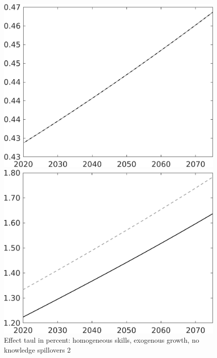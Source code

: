 \documentclass[12pt]{article}
\begin{document}
\begin{figure}[h!!]
	\centering
	\caption{Effect taul in percent: homogeneous skills, exogenous growth, no knowledge spillovers 2}\label{fig:LF_BAU_nsk1_xgr1_noknow2}
	
	\begin{minipage}[]{0.32\textwidth}
		\includegraphics[width=1\textwidth]{../../codding_model/own_basedOnFried/optimalPol_010922_revision/figures/all_13Sept22/CompTaul_LFBAU_Reg0_EY_spillover0_nsk1_xgr1_knspil1_sep1_countec0_GovRev0_etaa0.79_lgd0.png}
	\end{minipage}	
	\begin{minipage}[]{0.32\textwidth}
		\includegraphics[width=1\textwidth]{../../codding_model/own_basedOnFried/optimalPol_010922_revision/figures/all_13Sept22/CompTaul_LFBAU_Reg0_N_spillover0_nsk1_xgr1_knspil1_sep1_countec0_GovRev0_etaa0.79_lgd0.png}

\end{minipage}
\end{figure}
\end{document}
